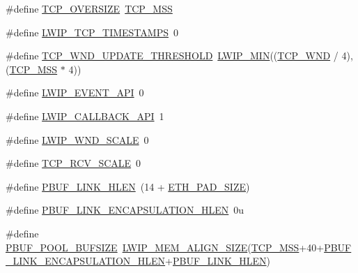 \begin{DoxyCompactItemize}
\item 
\#define \hyperlink{group__lwip__opts__tcp_ga5648e2580bb55c0efdfbebcf3bad1eef}{T\+C\+P\+\_\+\+O\+V\+E\+R\+S\+I\+ZE}~\hyperlink{group__lwip__opts__tcp_gaf1ab7bb27860aa3677c387a2f3ba317b}{T\+C\+P\+\_\+\+M\+SS}
\item 
\#define \hyperlink{group__lwip__opts__tcp_ga249bc450bb818cf2ef3cf1472ff354fd}{L\+W\+I\+P\+\_\+\+T\+C\+P\+\_\+\+T\+I\+M\+E\+S\+T\+A\+M\+PS}~0
\item 
\#define \hyperlink{group__lwip__opts__tcp_ga5d45732ba3a8438b141096d86e07ef8d}{T\+C\+P\+\_\+\+W\+N\+D\+\_\+\+U\+P\+D\+A\+T\+E\+\_\+\+T\+H\+R\+E\+S\+H\+O\+LD}~\hyperlink{openmote-cc2538_2lwip_2src_2include_2lwip_2def_8h_a748f5df614a3fc989e8900fd229d6e4e}{L\+W\+I\+P\+\_\+\+M\+IN}((\hyperlink{openmote-cc2538_2lwip_2test_2unit_2lwipopts_8h_a7f535a6efb5cdf86c3210e35ece1d6a7}{T\+C\+P\+\_\+\+W\+ND} / 4), (\hyperlink{group__lwip__opts__tcp_gaf1ab7bb27860aa3677c387a2f3ba317b}{T\+C\+P\+\_\+\+M\+SS} $\ast$ 4))
\item 
\#define \hyperlink{group__lwip__opts__tcp_ga39f76e811117155be8525bb386ecddb7}{L\+W\+I\+P\+\_\+\+E\+V\+E\+N\+T\+\_\+\+A\+PI}~0
\item 
\#define \hyperlink{group__lwip__opts__tcp_ga2ca03bfa6f604ba536e38ccfdbdf9c8d}{L\+W\+I\+P\+\_\+\+C\+A\+L\+L\+B\+A\+C\+K\+\_\+\+A\+PI}~1
\item 
\#define \hyperlink{group__lwip__opts__tcp_ga88dbbfeeeb41b129fdc8235fc08bb530}{L\+W\+I\+P\+\_\+\+W\+N\+D\+\_\+\+S\+C\+A\+LE}~0
\item 
\#define \hyperlink{group__lwip__opts__tcp_ga768765a2c678fefeca6c89aae0cf629f}{T\+C\+P\+\_\+\+R\+C\+V\+\_\+\+S\+C\+A\+LE}~0
\item 
\#define \hyperlink{group__lwip__opts__pbuf_ga35998a3d56af9940e6a80bb372597685}{P\+B\+U\+F\+\_\+\+L\+I\+N\+K\+\_\+\+H\+L\+EN}~(14 + \hyperlink{group__lwip__opts__arp_gad7fa3b356ca7e603e848b069c4cc6276}{E\+T\+H\+\_\+\+P\+A\+D\+\_\+\+S\+I\+ZE})
\item 
\#define \hyperlink{group__lwip__opts__pbuf_ga6e1ba1875ae5168a17b53d83597bc1de}{P\+B\+U\+F\+\_\+\+L\+I\+N\+K\+\_\+\+E\+N\+C\+A\+P\+S\+U\+L\+A\+T\+I\+O\+N\+\_\+\+H\+L\+EN}~0u
\item 
\#define \hyperlink{group__lwip__opts__pbuf_gae61f4491d56e805e79b79eb5d35a00e5}{P\+B\+U\+F\+\_\+\+P\+O\+O\+L\+\_\+\+B\+U\+F\+S\+I\+ZE}~\hyperlink{group__compiler__abstraction_gaef204be511fd32f681b55abc08e9ae18}{L\+W\+I\+P\+\_\+\+M\+E\+M\+\_\+\+A\+L\+I\+G\+N\+\_\+\+S\+I\+ZE}(\hyperlink{group__lwip__opts__tcp_gaf1ab7bb27860aa3677c387a2f3ba317b}{T\+C\+P\+\_\+\+M\+SS}+40+\hyperlink{group__lwip__opts__pbuf_ga6e1ba1875ae5168a17b53d83597bc1de}{P\+B\+U\+F\+\_\+\+L\+I\+N\+K\+\_\+\+E\+N\+C\+A\+P\+S\+U\+L\+A\+T\+I\+O\+N\+\_\+\+H\+L\+EN}+\hyperlink{group__lwip__opts__pbuf_ga35998a3d56af9940e6a80bb372597685}{P\+B\+U\+F\+\_\+\+L\+I\+N\+K\+\_\+\+H\+L\+EN})

\end{DoxyCompactItemize}
